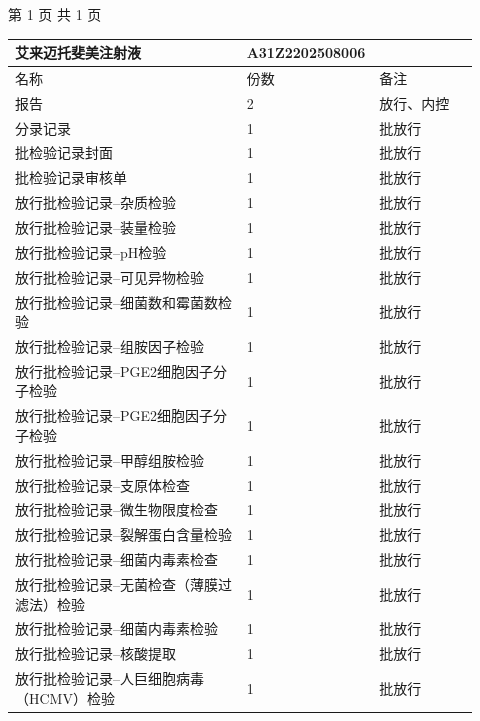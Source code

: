 \documentclass[UTF8,10pt,a4paper,fontset=fandol]{ctexart}
\newcommand{\fieldvalue}[1]{#1}
\begin{document}
\vfill

\begin{center}
第 1 页 共 1 页
\end{center}

\newpage

\begin{center}
\small
\begin{tabular}{|p{0.59\linewidth}|p{0.08\linewidth}|p{0.25\linewidth}|}
\hline
艾来迈托斐美注射液 &
\fieldvalue{A31Z2202508006} &
\\ \hline
名称 & 份数 & 备注 \\ \hline
报告 & 2 & 放行、内控 \\ \hline
分录记录 & 1 & 批放行 \\ \hline
批检验记录封面 & 1 & 批放行 \\ \hline
批检验记录审核单 & 1 & 批放行 \\ \hline
放行批检验记录--杂质检验 & 1 & 批放行 \\ \hline
放行批检验记录--装量检验 & 1 & 批放行 \\ \hline
放行批检验记录--pH检验 & 1 & 批放行 \\ \hline
放行批检验记录--可见异物检验 & 1 & 批放行 \\ \hline
放行批检验记录--细菌数和霉菌数检验 & 1 & 批放行 \\ \hline
放行批检验记录--组胺因子检验 & 1 & 批放行 \\ \hline
放行批检验记录--PGE2细胞因子分子检验 & 1 & 批放行 \\ \hline
放行批检验记录--PGE2细胞因子分子检验 & 1 & 批放行 \\ \hline
放行批检验记录--甲醇组胺检验 & 1 & 批放行 \\ \hline
放行批检验记录--支原体检查 & 1 & 批放行 \\ \hline
放行批检验记录--微生物限度检查 & 1 & 批放行 \\ \hline
放行批检验记录--裂解蛋白含量检验 & 1 & 批放行 \\ \hline
放行批检验记录--细菌内毒素检查 & 1 & 批放行 \\ \hline
放行批检验记录--无菌检查（薄膜过滤法）检验 & 1 & 批放行 \\ \hline
放行批检验记录--细菌内毒素检验 & 1 & 批放行 \\ \hline
放行批检验记录--核酸提取 & 1 & 批放行 \\ \hline
放行批检验记录--人巨细胞病毒（HCMV）检验 & 1 & 批放行 \\ \hline

\end{tabular}
\end{center}
\end{document}
